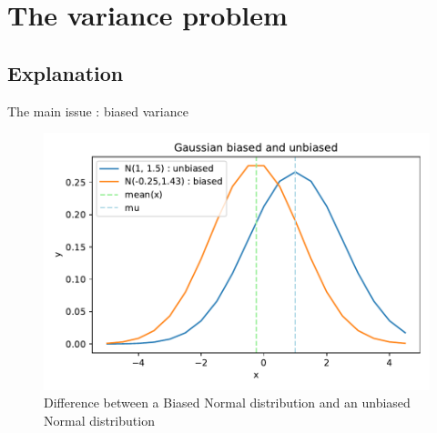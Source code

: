 \documentclass[unknownkeysallowed]{beamer}
\begin{document}




\section{The variance problem}
\label{sec:The variance problem}

\subsection{Explanation}
\label{sub:Explanation}

\begin{frame}{The main issue : biased variance}

\vspace{0.4cm}
\begin{figure}
    \centering
    \includegraphics[scale=0.5]{images/Biased_normal_distri.pdf}
    \caption{Difference between a Biased Normal distribution and an unbiased Normal distribution}
    \label{Figure 1}
\end{figure}



\end{frame}
\end{document}
